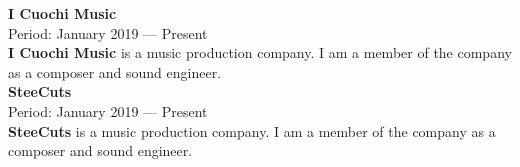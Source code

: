 \documentclass[a4paper,9pt]{extarticle}
\begin{document}
\noindent
\textbf{I Cuochi Music} \\
Period: January 2019 --- Present \\
\textbf{I Cuochi Music} is a music production company. I am a member of the company as a composer and sound engineer. \\

\noindent
\textbf{SteeCuts} \\
Period: January 2019 --- Present \\
\textbf{SteeCuts} is a music production company. I am a member of the company as a composer and sound engineer. \\


%
%
%


%
%
%


\end{document}
